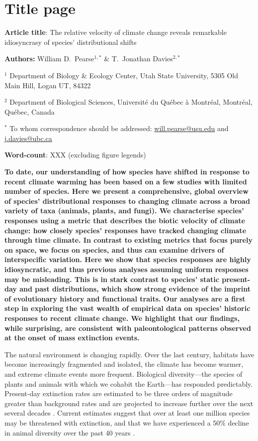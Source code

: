 \documentclass[12pt]{report}
\begin{document}
\section*{Title page}
\textbf{Article title}: The relative velocity of climate change
reveals remarkable idiosyncrasy of species' distributional shifts

\textbf{Authors:} William D.\ Pearse$^{1,*}$ \& T.\ Jonathan
Davies$^{2,*}$

$^1$ Department of Biology \& Ecology Center, Utah State University,
5305 Old Main Hill, Logan UT, 84322

$^2$ Department of Biological Sciences, Universit\'{e} du Qu\'{e}bec
\`{a} Montr\'{e}al, Montr\'{e}al, Qu\'{e}bec, Canada

$^*$ To whom correspondence should be addressed:
\url{will.pearse@usu.edu} and \url{j.davies@ubc.ca}

\textbf{Word-count}: XXX (excluding figure legends)

\clearpage
\textbf{To date, our understanding of how species have shifted in
  response to recent climate warming has been based on a few studies
  with limited number of species. Here we present a comprehensive,
  global overview of species' distributional responses to changing
  climate across a broad variety of taxa (animals, plants, and
  fungi). We characterise species' responses using a metric that
  describes the biotic velocity of climate change: how closely
  species' responses have tracked changing climate through time
  climate. In contrast to existing metrics that focus purely on space,
  we focus on species, and thus can examine drivers of interspecific
  variation. Here we show that species responses are highly
  idiosyncratic, and thus previous analyses assuming uniform responses
  may be misleading. This is in stark contrast to species' static
  present-day and past distributions, which show strong evidence of
  the imprint of evolutionary history and functional traits. Our
  analyses are a first step in exploring the vast wealth of empirical
  data on species' historic responses to recent climate change. We
  highlight that our findings, while surprising, are consistent with
  paleontological patterns observed at the onset of mass extinction
  events.}

The natural environment is changing rapidly. Over the last century,
habitats have become increasingly fragmented and
isolated\supercite{Haddad2015}, the climate has become warmer, and
extreme climate events more frequent\supercite{IPCC2014}. Biological
diversity---the species of plants and animals with which we cohabit
the Earth---has responded predictably. Present-day extinction rates
are estimated to be three orders of magnitude greater than background
rates \supercite{Pimm2014} and are projected to increase further over
the next several decades \supercite{MEA2005}. Current estimates
suggest that over at least one million species may be threatened with
extinction\supercite{IPBESland2019}, and that we have experienced a
50\% decline in animal diversity over the past 40 years
\supercite{McLellan2014}.
\end{document}
